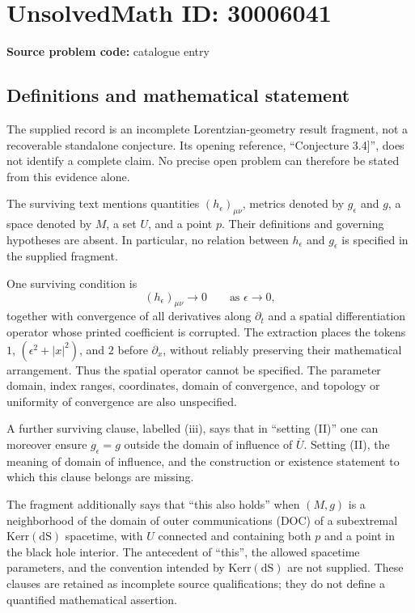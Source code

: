 \documentclass[11pt]{article}
\begin{document}
\section*{UnsolvedMath ID: 30006041}
\textbf{Source problem code:} catalogue entry
\subsection{Definitions and mathematical statement}
The supplied record is an incomplete Lorentzian-geometry result fragment, not a recoverable standalone conjecture. Its opening reference, ``Conjecture 3.4]'', does not identify a complete claim. No precise open problem can therefore be stated from this evidence alone.

The surviving text mentions quantities \((h_\epsilon)_{\mu\nu}\), metrics denoted by \(g_\epsilon\) and \(g\), a space denoted by \(M\), a set \(U\), and a point \(p\). Their definitions and governing hypotheses are absent. In particular, no relation between \(h_\epsilon\) and \(g_\epsilon\) is specified in the supplied fragment.

One surviving condition is
\[
(h_\epsilon)_{\mu\nu}\longrightarrow 0
\qquad\text{as }\epsilon\longrightarrow 0,
\]
together with convergence of all derivatives along \(\partial_t\) and a spatial differentiation operator whose printed coefficient is corrupted. The extraction places the tokens \(1\), \((\epsilon^2+|x|^2)\), and \(2\) before \(\partial_x\), without reliably preserving their mathematical arrangement. Thus the spatial operator cannot be specified. The parameter domain, index ranges, coordinates, domain of convergence, and topology or uniformity of convergence are also unspecified.

A further surviving clause, labelled (iii), says that in ``setting (II)'' one can moreover ensure \(g_\epsilon=g\) outside the domain of influence of \(\overline U\). Setting (II), the meaning of domain of influence, and the construction or existence statement to which this clause belongs are missing.

The fragment additionally says that ``this also holds'' when \((M,g)\) is a neighborhood of the domain of outer communications (DOC) of a subextremal \(\mathrm{Kerr(dS)}\) spacetime, with \(U\) connected and containing both \(p\) and a point in the black hole interior. The antecedent of ``this'', the allowed spacetime parameters, and the convention intended by \(\mathrm{Kerr(dS)}\) are not supplied. These clauses are retained as incomplete source qualifications; they do not define a quantified mathematical assertion.
\end{document}
